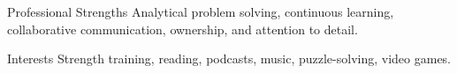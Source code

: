
\inforow
{Professional Strengths}
{Analytical problem solving, continuous learning, collaborative communication, ownership, and attention to detail.}

\inforow
{Interests}
{Strength training, reading, podcasts, music, puzzle-solving, video games.}
